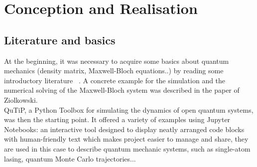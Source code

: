 \chapter{Conception and Realisation}
\label{chapter:conception}

\section{Literature and basics}
At the beginning, it was necessary to acquire some basics about quantum mechanics (density matrix, Maxwell-Bloch equations..) by reading some introductory literature ~\cite{tang2005}. A concrete example for the simulation and the numerical solving of the Maxwell-Bloch system was described in the paper of Ziolkowski.\\
QuTiP, a Python Toolbox for simulating the dynamics of open quantum systems, was then the starting point. It offered a variety of examples using Jupyter Notebooks: an interactive tool designed to display neatly arranged code blocks with human-friendly text which makes project easier to manage and share, they are used in this case to describe quantum mechanic systems, such as single-atom lasing, quantum Monte Carlo trajectories...\\
